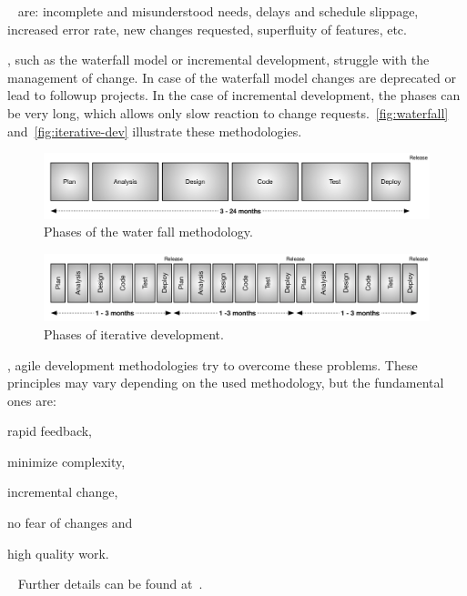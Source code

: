 \documentclass[%
    a4paper,    %
    justified,  %
    nobib,      %
    openany     %
]{tufte-book}
\makeatletter
\renewcommand{\label}[1]{\@tufte@label{##1}}%
\makeatother
\begin{document}
~\cite{beck-xp-2004} are:
incomplete and misunderstood needs, delays and schedule slippage, increased
error rate, new changes requested, superfluity of features,
etc.~\cite{beck-xp-2004}

, such as the
waterfall model or incremental development, struggle with the management of change. In case of the
waterfall model changes are deprecated or lead to followup projects. In the case of incremental
development, the phases can be very long, which allows only slow reaction to
change requests.~\autoref{fig:waterfall} and~\autoref{fig:iterative-dev}
illustrate these methodologies.

\begin{figure}[!htbp]
  \includegraphics[width=0.95\linewidth]{images/waterfall}
  \caption{Phases of the water fall methodology.~\cite[p. 16]{shore-aad-2007}}
\label{fig:waterfall}
\end{figure}

\begin{figure}[ht]
  \includegraphics[width=0.95\linewidth]{images/iterative-dev}
  \caption{Phases of iterative development.~\cite[p. 16]{shore-aad-2007}}
\label{fig:iterative-dev}
\end{figure}

, agile development
methodologies try
to overcome these problems. These principles may vary depending on the used
methodology, but the fundamental ones are:
\begin{enumerate*}
  \item rapid feedback,
  \item minimize complexity,
  \item incremental change,
  \item no fear of changes and
  \item high quality work.
\end{enumerate*}~\cite{beck-xp-2004}
Further details can be found at~\cite{beck-xp-2004, shore-aad-2007}.
\end{document}
